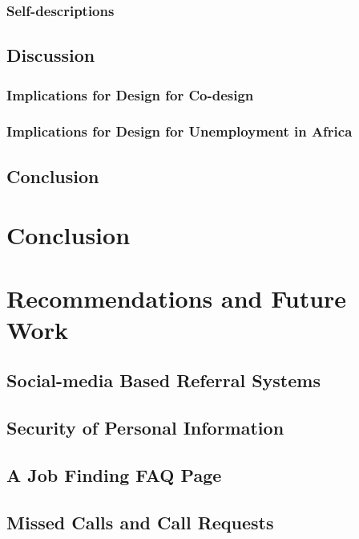 \documentclass[12pt,a4paper,oneside]{report}
\begin{document}
\subsection{Self-descriptions}

\section{Discussion}
\subsection{Implications for Design for Co-design}
\subsection{Implications for Design for Unemployment in Africa}

\section{Conclusion}


\chapter{Conclusion}


\chapter{Recommendations and Future Work}

\section{Social-media Based Referral Systems}

\section{Security of Personal Information}

\section{A Job Finding FAQ Page}

\section{Missed Calls and Call Requests}
\end{document}
